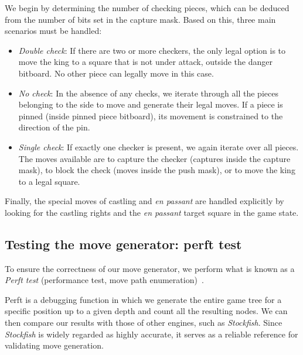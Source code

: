 \vspace{1em}

\noindent We begin by determining the number of checking pieces, which can be deduced from the number of bits set in the capture mask. Based on this, three main scenarios must be handled:

\begin{itemize}[itemsep=1pt]
    \item \textit{Double check}: If there are two or more checkers, the only legal option is to move the king to a square that is not under attack, outside the danger bitboard. No other piece can legally move in this case.
    \item \textit{No check}: In the absence of any checks, we iterate through all the pieces belonging to the side to move and generate their legal moves. If a piece is pinned (inside pinned piece bitboard), its movement is constrained to the direction of the pin.
    \item \textit{Single check}: If exactly one checker is present, we again iterate over all pieces. The moves available are to capture the checker (captures inside the capture mask), to block the check (moves inside the push mask), or to move the king to a legal square.
\end{itemize}

\noindent Finally, the special moves of castling and \textit{en passant} are handled explicitly by looking for the castling rights and the \textit{en passant} target square in the game state.

\subsection*{Testing the move generator: perft test}

To ensure the correctness of our move generator, we perform what is known as a \textit{Perft test} (performance test, move path enumeration)~\cite{Perft}.

\vspace{1em}

\noindent Perft is a debugging function in which we generate the entire game tree for a specific position up to a given depth and count all the resulting nodes. We can then compare our results with those of other engines, such as \textit{Stockfish}. Since \textit{Stockfish} is widely regarded as highly accurate, it serves as a reliable reference for validating move generation.

\vspace{1em}

